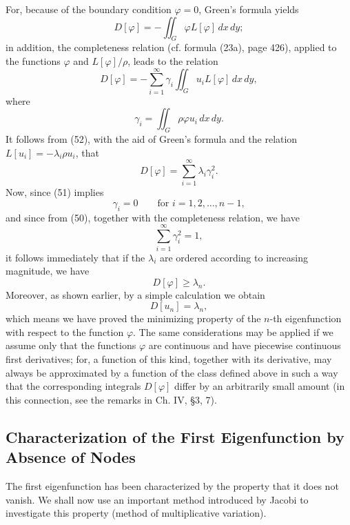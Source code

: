 For, because of the boundary condition $\varphi=0$, Green's formula yields
\[
D[\varphi]=-\iint_G\varphi L[\varphi]\,dx\,dy;
\]
in addition, the completeness relation (cf. formula (23a), page 426), applied to the functions $\varphi$ and $L[\varphi]/\rho$, leads to the relation
\begin{equation}\tag{52}
D[\varphi]=-
\sum_{i=1}^{\infty}\gamma_i\iint_Gu_iL[\varphi]\,dx\,dy,
\end{equation}
where
\[
\gamma_i=\iint_G\rho\varphi u_i\,dx\,dy.
\]
It follows from (52), with the aid of Green's formula and the relation $L[u_i]=-\lambda_i\rho u_i$, that
\begin{equation}\tag{53}
D[\varphi]=\sum_{i=1}^{\infty}\lambda_i\gamma_i^2.
\end{equation}
Now, since (51) implies
\[
\gamma_i=0\qquad\text{for }i=1,2,\ldots,n-1,
\]
and since from (50), together with the completeness relation, we have
\[
\sum_{i=1}^{\infty}\gamma_i^2=1,
\]
it follows immediately that if the $\lambda_i$ are ordered according to increasing magnitude, we have
\[
D[\varphi]\ge\lambda_n.
\]
Moreover, as shown earlier, by a simple calculation we obtain
\[
D[u_n]=\lambda_n,
\]
which means we have proved the minimizing property of the $n$-th eigenfunction with respect to the function $\varphi$. The same considerations may be applied if we assume only that the functions $\varphi$ are continuous and have piecewise continuous first derivatives; for, a function of this kind, together with its derivative, may always be approximated by a function of the class defined above in such a way that the corresponding integrals $D[\varphi]$ differ by an arbitrarily small amount (in this connection, see the remarks in Ch. IV, \S3, 7).

\subsection{Characterization of the First Eigenfunction by Absence of Nodes}
The first eigenfunction has been characterized by the property that it does not vanish. We shall now use an important method introduced by Jacobi to investigate this property (method of multiplicative variation).

